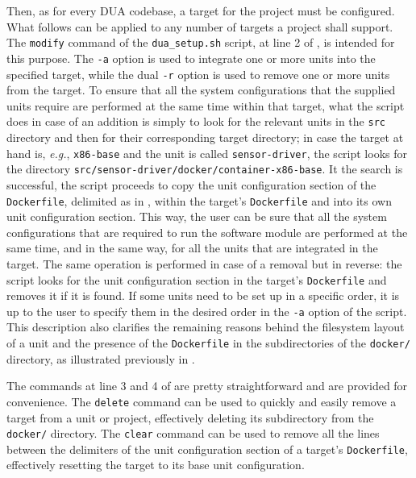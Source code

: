 Then, as for every DUA codebase, a target for the project must be configured. What follows can be applied to any number of targets a project shall support. The \texttt{modify} command of the \texttt{dua\_setup.sh} script, at line 2 of , is intended for this purpose. The \texttt{-a} option is used to integrate one or more units into the specified target, while the dual \texttt{-r} option is used to remove one or more units from the target. To ensure that all the system configurations that the supplied units require are performed at the same time within that target, what the script does in case of an addition is simply to look for the relevant units in the \texttt{src} directory and then for their corresponding target directory; in case the target at hand is, \emph{e.g.}, \texttt{x86-base} and the unit is called \texttt{sensor-driver}, the script looks for the directory \texttt{src/sensor-driver/docker/container-x86-base}. It the search is successful, the script proceeds to copy the unit configuration section of the \texttt{Dockerfile}, delimited as in , within the target's \texttt{Dockerfile} and into its own unit configuration section. This way, the user can be sure that all the system configurations that are required to run the software module are performed at the same time, and in the same way, for all the units that are integrated in the target. The same operation is performed in case of a removal but in reverse: the script looks for the unit configuration section in the target's \texttt{Dockerfile} and removes it if it is found. If some units need to be set up in a specific order, it is up to the user to specify them in the desired order in the \texttt{-a} option of the script. This description also clarifies the remaining reasons behind the filesystem layout of a unit and the presence of the \texttt{Dockerfile} in the subdirectories of the \texttt{docker/} directory, as illustrated previously in .

The commands at line 3 and 4 of  are pretty straightforward and are provided for convenience. The \texttt{delete} command can be used to quickly and easily remove a target from a unit or project, effectively deleting its subdirectory from the \texttt{docker/} directory. The \texttt{clear} command can be used to remove all the lines between the delimiters of the unit configuration section of a target's \texttt{Dockerfile}, effectively resetting the target to its base unit configuration.

